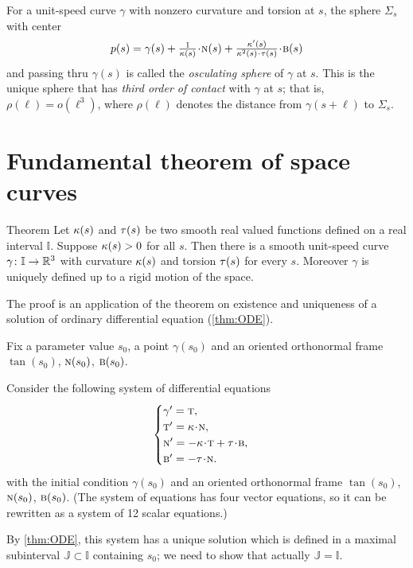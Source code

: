 For a unit-speed curve $\gamma$ with nonzero curvature and torsion at $s$,
the sphere $\Sigma_s$ with center
\[p(s)=\gamma(s)+\tfrac1{\kur(s)}\cdot \norm(s)+\tfrac{\kur'(s)}{\kur^2(s)\cdot\tor(s)}\cdot\bi(s)\]
and passing thru $\gamma(s)$ is called the \emph{osculating sphere} of $\gamma$ at $s$.
This is the unique sphere that has \emph{third order of contact} with $\gamma$ at $s$;
that is, $\rho(\ell)=o(\ell^3)$, where $\rho(\ell)$ denotes the distance from $\gamma(s+\ell)$ to $\Sigma_s$.
 
\section{Fundamental theorem of space curves}

\begin{thm}{Theorem}\label{thm:fund-curves}
Let $\kappa(s)$ and $\tau(s)$ be two smooth real valued functions defined on a real interval $\mathbb{I}$.
Suppose $\kappa(s)>0$ for all $s$.
Then there is a smooth unit-speed curve $\gamma\colon\mathbb{I}\to\mathbb{R}^3$ with curvature $\kappa(s)$ and torsion $\tau(s)$ for every $s$.
Moreover $\gamma$ is uniquely defined up to a rigid motion of the space.
\end{thm}

The proof is an application of the theorem on existence and uniqueness of a solution of ordinary differential equation (\ref{thm:ODE}).

Fix a parameter value $s_0$, a point $\gamma(s_0)$ and an oriented orthonormal frame $\tan(s_0)$, $\textsc{n}(s_0)$, $\textsc{b}(s_0)$.

Consider the following system of differential equations
\[
\begin{cases}
\gamma'=\tan,
\\
\tan'=\kur\cdot\norm,
\\
\norm'=-\kur\cdot\tan+\tor\cdot\bi,
\\
\bi'=-\tor\cdot\norm.
\end{cases}
\]
with the initial condition $\gamma(s_0)$ and an oriented orthonormal frame $\tan(s_0)$, $\textsc{n}(s_0)$, $\textsc{b}(s_0)$.
(The system of equations has four vector equations, so it can be rewritten as a system of 12 scalar equations.)

By \ref{thm:ODE}, this system has a unique solution which is defined in a maximal subinterval $\mathbb{J}\subset \mathbb{I}$ containing $s_0$; we need to show that actually $\mathbb{J}= \mathbb{I}$.

